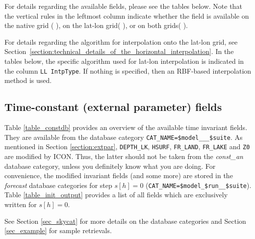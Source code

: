For details regarding the available fields, please see the tables below. Note that the vertical rules in the leftmost column indicate whether the field is 
available on the native grid ($\,$\markRed$\,$), on the lat-lon grid($\,$\markBlue$\,$), or on both grids($\,$\markRed\markBlue$\,$). 

For details regarding the algorithm for interpolation onto the lat-lon
grid, see
Section~\ref{section:technical_details_of_the_horizontal_interpolation}. In the tables below, the specific algorithm used for 
lat-lon interpolation is indicated in the column \texttt{LL IntpType}. If nothing is specified, then an RBF-based interpolation 
method is used.



\subsection{Time-constant (external parameter) fields}\label{sec_const_outfields}

Table \ref{table_constdb} provides an overview of the available time invariant fields. They are available from the database category 
\texttt{CAT\_NAME=\$model\_\_\_\$suite}. As mentioned in Section \ref{section:extpar}, \texttt{DEPTH\_LK}, 
\texttt{HSURF}, \texttt{FR\_LAND}, \texttt{FR\_LAKE} and \texttt{Z0} are modified by ICON. Thus, the latter should 
not be taken from the \emph{const\_an} database category, unless you definitely know what you are doing. For convenience, the 
modified invariant fields (and some more) are stored in the \emph{forecast} database categories for step $s[h]=0$ 
(\texttt{CAT\_NAME=\$model\_\$run\_\_\$suite}). Table \ref{table_init_output} provides a list of all fields which are exclusively 
written for $s[h]=0$.

See Section \ref{sec_skycat} for more details on the database categories and Section \ref{sec_example} for sample retrievals.
 


